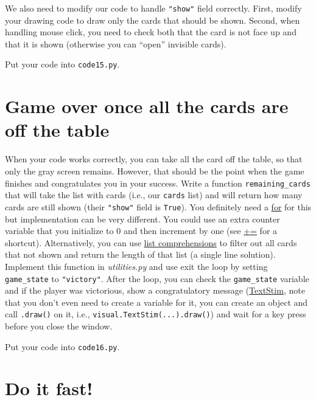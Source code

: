 \documentclass[
]{book}
\begin{document}
We also need to modify our code to handle \texttt{"show"} field correctly. First, modify your drawing code to draw only the cards that should be shown. Second, when handling mouse click, you need to check both that the card is not face up and that it is shown (otherwise you can ``open'' invisible cards).

Put your code into \texttt{code15.py}.

\hypertarget{game-over-once-all-the-cards-are-off-the-table}{%
\section{Game over once all the cards are off the table}\label{game-over-once-all-the-cards-are-off-the-table}}

When your code works correctly, you can take all the card off the table, so that only the gray screen remains. However, that should be the point when the game finishes and congratulates you in your success. Write a function \texttt{remaining\_cards} that will take the list with cards (i.e., our \texttt{cards} list) and will return how many cards are still shown (their \texttt{"show"} field is \texttt{True}). You definitely need a \protect\hyperlink{for-loop}{for} for this but implementation can be very different. You could use an extra counter variable that you initialize to 0 and then increment by one (see \href{https://docs.python.org/3/reference/simple_stmts.html\#augmented-assignment-statements}{+=} for a shortcut). Alternatively, you can use \href{l\#list-comprehension}{list comprehensions} to filter out all cards that not shown and return the length of that list (a single line solution). Implement this function in \emph{utilities.py} and use exit the loop by setting \texttt{game\_state} to \texttt{"victory"}. After the loop, you can check the \texttt{game\_state} variable and if the player was victorious, show a congratulatory message (\href{https://psychopy.org/api/visual/textstim.html\#psychopy.visual.TextStim}{TextStim}, note that you don't even need to create a variable for it, you can create an object and call \texttt{.draw()} on it, i.e., \texttt{visual.TextStim(...).draw()}) and wait for a key press before you close the window.

Put your code into \texttt{code16.py}.

\hypertarget{do-it-fast}{%
\section{Do it fast!}\label{do-it-fast}}
\end{document}
